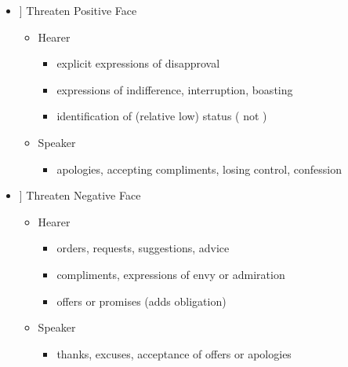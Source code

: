 \documentclass[headrule,footrule]{foils}
\newcommand{\PF}[1]{\Smiley[#1][green]}
\newcommand{\NF}[1]{\Annoey[#1][red]}
\begin{document}
\begin{itemize}\addtolength{\itemsep}{-1ex}
\item[\PF{1}] Threaten Positive Face
  \begin{itemize}
  \item Hearer
    \begin{itemize}
    \item explicit expressions of disapproval 
    \item expressions of indifference, interruption, boasting
    \item identification of (relative low) status ( not )
    \end{itemize}
  \item Speaker
    \begin{itemize}
    \item apologies, accepting  compliments, losing control, confession
    \end{itemize}
  \end{itemize}
\item[\NF{1}] Threaten Negative Face
  \begin{itemize}
  \item Hearer
    \begin{itemize}
    \item orders, requests, suggestions, advice
    \item compliments, expressions of envy or admiration
    \item offers or promises (adds obligation)
    \end{itemize}
  \item Speaker
    \begin{itemize}
    \item thanks, excuses, acceptance of offers or apologies
    \end{itemize}
  \end{itemize}
\end{itemize}
\end{document}
